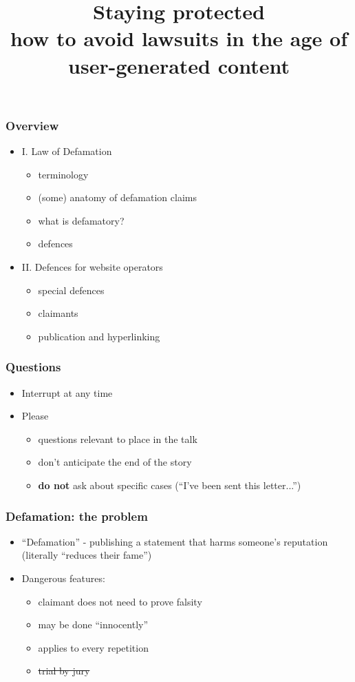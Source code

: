 \documentclass[ignorenonframetext,]{beamer}
\title{Staying protected \\
how to avoid lawsuits in the age of user-generated content}
\date{}
\begin{document}
\frame{\titlepage}

\begin{frame}
\frametitle{Overview}
\begin{itemize}
\item  I. Law of Defamation

  \begin{itemize}
  \item    terminology
  \item    (some) anatomy of defamation claims
  \item    what is defamatory?
  \item    defences
  \end{itemize}
\item  II. Defences for website operators

  \begin{itemize}
  \item  special defences
  \item  claimants
  \item  publication and hyperlinking
  \end{itemize}
\end{itemize}

\end{frame}

\begin{frame}
  \frametitle{Questions}
  \begin{itemize}
  \item Interrupt at any time
  \item Please
    \begin{itemize}
    \item questions relevant to place in the talk
    \item don't anticipate the end of the story
    \item {\bf do not} ask about specific cases (``I've been sent this letter...'')
    \end{itemize}
  \end{itemize}
\end{frame}

\begin{frame}
\frametitle{Defamation: the problem}
\begin{itemize}
\item ``Defamation'' - publishing a statement that harms someone's reputation (literally ``reduces their fame'')
\item Dangerous features:
  \begin{itemize}
  \item claimant does not need to prove falsity
  \item may be done ``innocently''
  \item applies to every repetition
  \item \sout{trial by jury}
  \end{itemize}
\end{itemize}
\end{frame}
\end{document}
